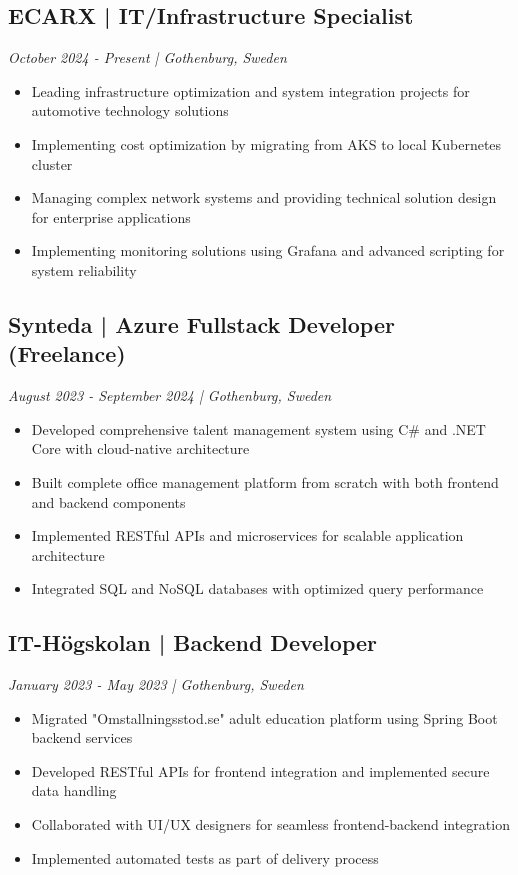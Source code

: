 \documentclass[11pt,a4paper]{article}
\begin{document}
\subsection*{ECARX | IT/Infrastructure Specialist}
\textit{October 2024 - Present | Gothenburg, Sweden}
\begin{itemize}[noitemsep]
\item Leading infrastructure optimization and system integration projects for automotive technology solutions
\item Implementing cost optimization by migrating from AKS to local Kubernetes cluster
\item Managing complex network systems and providing technical solution design for enterprise applications
\item Implementing monitoring solutions using Grafana and advanced scripting for system reliability
\end{itemize}

\subsection*{Synteda | Azure Fullstack Developer (Freelance)}
\textit{August 2023 - September 2024 | Gothenburg, Sweden}
\begin{itemize}[noitemsep]
\item Developed comprehensive talent management system using C\# and .NET Core with cloud-native architecture
\item Built complete office management platform from scratch with both frontend and backend components
\item Implemented RESTful APIs and microservices for scalable application architecture
\item Integrated SQL and NoSQL databases with optimized query performance
\end{itemize}

\subsection*{IT-Högskolan | Backend Developer}
\textit{January 2023 - May 2023 | Gothenburg, Sweden}
\begin{itemize}[noitemsep]
\item Migrated "Omstallningsstod.se" adult education platform using Spring Boot backend services
\item Developed RESTful APIs for frontend integration and implemented secure data handling
\item Collaborated with UI/UX designers for seamless frontend-backend integration
\item Implemented automated tests as part of delivery process
\end{itemize}
\end{document}
